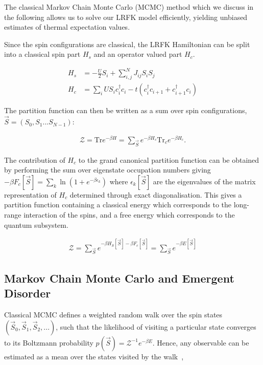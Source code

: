 The classical Markov Chain Monte Carlo (MCMC) method which we discuss in the following allows us to solve our LRFK model efficiently, yielding unbiased estimates of thermal expectation values.

Since the spin configurations are classical, the LRFK Hamiltonian can be split into a classical spin part \(H_s\) and an operator valued part \(H_c\).

\[\begin{aligned}
H_s& = - \frac{U}{2}S_i + \sum_{i, j}^{N} J_{ij} S_i S_j \\
H_c& = \sum_i U S_i c^\dagger_{i}c_{i} -t(c^\dagger_{i}c_{i+1} + c^\dagger_{i+1}c_{i}) \end{aligned}\]

The partition function can then be written as a sum over spin configurations, \(\vec{S} = (S_0, S_1...S_{N-1})\):

\[\begin{aligned}
\mathcal{Z} = \mathrm{Tr} e^{-\beta H}= \sum_{\vec{S}} e^{-\beta H_s} \mathrm{Tr}_c e^{-\beta H_c} .\end{aligned}\]

The contribution of \(H_c\) to the grand canonical partition function can be obtained by performing the sum over eigenstate occupation numbers giving \(-\beta F_c[\vec{S}] = \sum_k \ln{(1 + e^{- \beta \epsilon_k})}\) where \({\epsilon_k[\vec{S}]}\) are the eigenvalues of the matrix representation of \(H_c\) determined through exact diagonalisation. This gives a partition function containing a classical energy which corresponds to the long-range interaction of the spins, and a free energy which corresponds to the quantum subsystem.

\[\begin{aligned}
\mathcal{Z} = \sum_{\vec{S}} e^{-\beta H_S[\vec{S}] - \beta F_c[\vec{S}]} = \sum_{\vec{S}} e^{-\beta E[\vec{S}]}\end{aligned}\]

\hypertarget{markov-chain-monte-carlo-and-emergent-disorder}{%
\subsection{Markov Chain Monte Carlo and Emergent Disorder}\label{markov-chain-monte-carlo-and-emergent-disorder}}

Classical MCMC defines a weighted random walk over the spin states \((\vec{S}_0, \vec{S}_1, \vec{S}_2, ...)\), such that the likelihood of visiting a particular state converges to its Boltzmann probability \(p(\vec{S}) = \mathcal{Z}^{-1} e^{-\beta E}\). Hence, any observable can be estimated as a mean over the states visited by the walk~\autocite{binderGuidePracticalWork1988,kerteszAdvancesComputerSimulation1998,wolffMonteCarloErrors2004},


